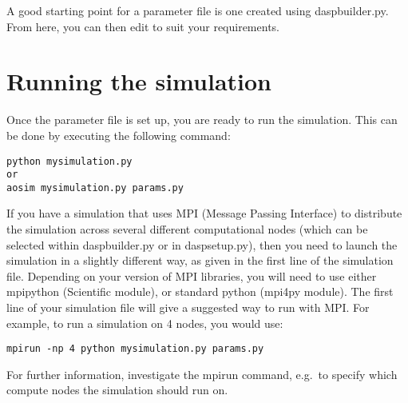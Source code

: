 \documentclass{article}
\begin{document}
A good starting point for a parameter file is one created using
daspbuilder.py.  From here, you can then edit to suit your requirements.

\section{Running the simulation}
Once the parameter file is set up, you are ready to run the
simulation.  This can be done by executing the following command:

\begin{verbatim}
python mysimulation.py
or
aosim mysimulation.py params.py
\end{verbatim}

If you have a simulation that uses MPI (Message Passing Interface) to
distribute the simulation across several different computational nodes
(which can be selected within daspbuilder.py or in daspsetup.py), then
you need to launch the simulation in a slightly different way, as
given in the first line of the simulation file.  Depending on your
version of MPI libraries, you will need to use either mpipython
(Scientific module), or standard python (mpi4py module).  The first
line of your simulation file will give a suggested way to run with
MPI.  For example, to run a simulation on 4 nodes, you would use:
\begin{verbatim}
mpirun -np 4 python mysimulation.py params.py
\end{verbatim}
For further information, investigate the mpirun command, e.g.\ to
specify which compute nodes the simulation should run on.
\end{document}
